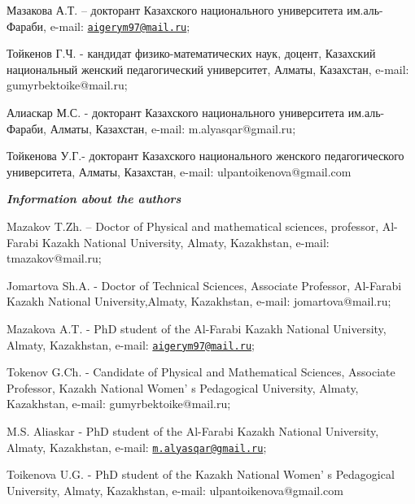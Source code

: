 Мазакова А.Т. -- докторант Казахского национального университета
им.аль-Фараби, e-mail:
\href{mailto:aigerym97@mail.ru}{\nolinkurl{aigerym97@mail.ru}};

Тойкенов Г.Ч. - кандидат физико-математических наук, доцент, Казахский
национальный женский педагогический университет, Алматы, Казахстан,
e-mail: gumyrbektoike@mail.ru;

Алиаскар М.С. - докторант Казахского национального университета
им.аль-Фараби, Алматы, Казахстан, e-mail: m.alyasqar@gmail.ru;

Тойкенова У.Г.- докторант Казахского национального женского
педагогического университета, Алматы, Казахстан, e-mail:
ulpantoikenova@gmail.com

\emph{{\bfseries Information about the authors}}

Mazakov T.Zh. -- Doctor of Physical and mathematical sciences,
professor, Al-Farabi Kazakh National University, Almaty, Kazakhstan,
e-mail: tmazakov@mail.ru;

Jomartova Sh.A. - Doctor of Technical Sciences, Associate Professor,
Al-Farabi Kazakh National University,Almaty, Kazakhstan, e-mail:
jomartova@mail.ru;

Mazakova A.T. - PhD student of the Al-Farabi Kazakh National University,
Almaty, Kazakhstan, e-mail:
\href{mailto:aigerym97@mail.ru}{\nolinkurl{aigerym97@mail.ru}};

Tokenov G.Ch. - Candidate of Physical and Mathematical Sciences,
Associate Professor, Kazakh National Women' s Pedagogical
University, Almaty, Kazakhstan, e-mail: gumyrbektoike@mail.ru;

M.S. Aliaskar - PhD student of the Al-Farabi Kazakh National University,
Almaty, Kazakhstan, e-mail:
\href{mailto:m.alyasqar@gmail.ru}{\nolinkurl{m.alyasqar@gmail.ru}};

Toikenova U.G. - PhD student of the Kazakh National
Women' s Pedagogical University, Almaty, Kazakhstan,
e-mail: ulpantoikenova@gmail.com
